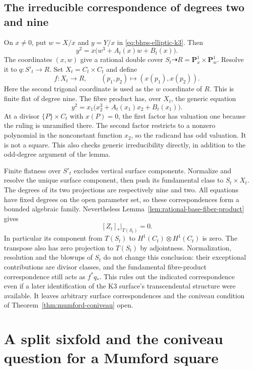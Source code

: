 \documentclass[11pt]{article}
\theoremstyle{definition}
\theoremstyle{remark}
\begin{document}
\subsection{The irreducible correspondence of degrees two and nine}

On $x\ne0$, put $w=X/x$ and $y=Y/x$ in
\eqref{eq:bhps-elliptic-k3}.  Then
\[
 y^2=x\bigl(w^3+A_t(x)w+B_t(x)\bigr).
\]
The coordinates $(x,w)$ give a rational double cover
$S_t\dashrightarrow R=\mathbf P^1_x\times\mathbf P^1_w$.
Resolve it to $q:S'_t\to R$.
Set $X_t=C_t\times C_t$ and define
\[
 f:X_t\longrightarrow R,\qquad
       (p_1,p_2)\longmapsto(x(p_1),x(p_2)).
\]
Here the second trigonal coordinate is used as the $w$ coordinate
of $R$.  This is finite flat of degree nine.
The fibre product has, over $X_t$, the generic equation
\[
 y^2=x_1\bigl(x_2^3+A_t(x_1)x_2+B_t(x_1)\bigr).
\]
At a divisor $\{P\}\times C_t$ with $x(P)=0$, the first factor
has valuation one because the ruling is unramified there.
The second factor restricts to a nonzero polynomial in the
nonconstant function $x_2$, so the radicand has odd valuation.
It is not a square.  This also checks generic irreducibility
directly, in addition to the odd-degree argument of the lemma.

Finite flatness over $S'_t$ excludes vertical surface components.
Normalize and resolve the unique surface component, then push its
fundamental class to $S_t\times X_t$.  The degrees of its two
projections are respectively nine and two.
All equations have fixed degrees on the open parameter set,
so these correspondences form a bounded algebraic family.
Nevertheless Lemma~\ref{lem:rational-base-fiber-product} gives
\[
 [Z_t]_*|_{T(S_t)}=0.
\]
In particular its component from $T(S_t)$ to
$H^1(C_t)\otimes H^1(C_t)$ is zero.
The transpose also has zero projection to $T(S_t)$ by adjointness.
Normalization, resolution and the blowups of $S_t$ do not change
this conclusion: their exceptional contributions are divisor
classes, and the fundamental fibre-product correspondence still
acts as $f^*q_*$.
This rules out the indicated correspondence even if a later
identification of the K3 surface's transcendental structure were
available.  It leaves arbitrary surface correspondences and the
coniveau condition of Theorem~\ref{thm:mumford-coniveau} open.
\section{A split sixfold and the coniveau question for a Mumford square}
\label{sec:mumford-coniveau}
\end{document}

